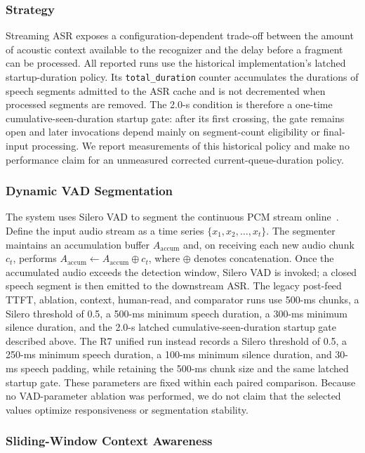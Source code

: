 \documentclass[conference]{IEEEtran}
\begin{document}
\subsubsection{Strategy}

Streaming ASR exposes a configuration-dependent trade-off between the amount of acoustic context available to the recognizer and the delay before a fragment can be processed. All reported runs use the historical implementation's latched startup-duration policy. Its \texttt{total\_duration} counter accumulates the durations of speech segments admitted to the ASR cache and is not decremented when processed segments are removed. The 2.0-s condition is therefore a one-time cumulative-seen-duration startup gate: after its first crossing, the gate remains open and later invocations depend mainly on segment-count eligibility or final-input processing. We report measurements of this historical policy and make no performance claim for an unmeasured corrected current-queue-duration policy.

\subsubsection{Dynamic VAD Segmentation}

The system uses Silero VAD to segment the continuous PCM stream online~\cite{ref13}. Define the input audio stream as a time series $\{x_1,x_2,\dots,x_t\}$. The segmenter maintains an accumulation buffer $A_{\mathrm{accum}}$ and, on receiving each new audio chunk $c_t$, performs $A_{\mathrm{accum}}\leftarrow A_{\mathrm{accum}}\oplus c_t$, where $\oplus$ denotes concatenation. Once the accumulated audio exceeds the detection window, Silero VAD is invoked; a closed speech segment is then emitted to the downstream ASR. The legacy post-feed TTFT, ablation, context, human-read, and comparator runs use 500-ms chunks, a Silero threshold of 0.5, a 500-ms minimum speech duration, a 300-ms minimum silence duration, and the 2.0-s latched cumulative-seen-duration startup gate described above. The R7 unified run instead records a Silero threshold of 0.5, a 250-ms minimum speech duration, a 100-ms minimum silence duration, and 30-ms speech padding, while retaining the 500-ms chunk size and the same latched startup gate. These parameters are fixed within each paired comparison. Because no VAD-parameter ablation was performed, we do not claim that the selected values optimize responsiveness or segmentation stability.

\subsubsection{Sliding-Window Context Awareness}
\end{document}
